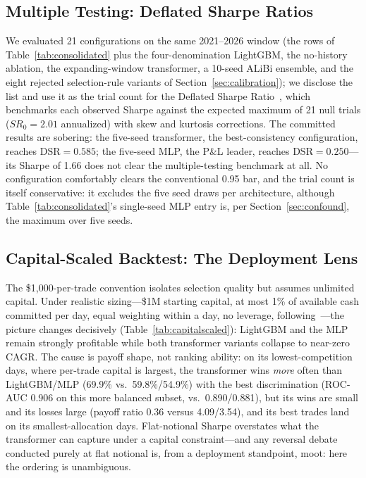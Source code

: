 \documentclass[sigconf,review]{acmart}
\begin{document}
\subsection{Multiple Testing: Deflated Sharpe Ratios}
\label{sec:dsr}
We evaluated 21 configurations on the same 2021--2026 window (the rows of Table~\ref{tab:consolidated} plus the four-denomination LightGBM, the no-history ablation, the expanding-window transformer, a 10-seed ALiBi ensemble, and the eight rejected selection-rule variants of Section~\ref{sec:calibration}); we disclose the list and use it as the trial count for the Deflated Sharpe Ratio~\cite{bailey2014deflated}, which benchmarks each observed Sharpe against the expected maximum of 21 null trials ($SR_0=2.01$ annualized) with skew and kurtosis corrections. The committed results are sobering: the five-seed transformer, the best-consistency configuration, reaches $\mathrm{DSR}=0.585$; the five-seed MLP, the P\&L leader, reaches $\mathrm{DSR}=0.250$---its Sharpe of 1.66 does not clear the multiple-testing benchmark at all. No configuration comfortably clears the conventional 0.95 bar, and the trial count is itself conservative: it excludes the five seed draws per architecture, although Table~\ref{tab:consolidated}'s single-seed MLP entry is, per Section~\ref{sec:confound}, the maximum over five seeds.

\subsection{Capital-Scaled Backtest: The Deployment Lens}
\label{sec:capitalscaled}
The \$1{,}000-per-trade convention isolates selection quality but assumes unlimited capital. Under realistic sizing---\$1M starting capital, at most 1\% of available cash committed per day, equal weighting within a day, no leverage, following~\cite{glasserman2025tp2}---the picture changes decisively (Table~\ref{tab:capitalscaled}): LightGBM and the MLP remain strongly profitable while both transformer variants collapse to near-zero CAGR. The cause is payoff shape, not ranking ability: on its lowest-competition days, where per-trade capital is largest, the transformer wins \emph{more} often than LightGBM/MLP (69.9\% vs.\ 59.8\%/54.9\%) with the best discrimination (ROC-AUC 0.906 on this more balanced subset, vs.\ 0.890/0.881), but its wins are small and its losses large (payoff ratio 0.36 versus 4.09/3.54), and its best trades land on its smallest-allocation days. Flat-notional Sharpe overstates what the transformer can capture under a capital constraint---and any reversal debate conducted purely at flat notional is, from a deployment standpoint, moot: here the ordering is unambiguous.
\end{document}
